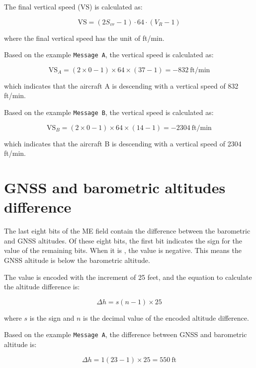 The final vertical speed ($\mathrm{VS}$) is calculated as:

\begin{equation}
  \mathrm{VS} = (2S_{vr} - 1) \cdot 64 \cdot (V_R - 1)
\end{equation}

where the final vertical speed has the unit of ft/min.

Based on the example \texttt{Message A}, the vertical speed is calculated as:

\begin{equation}
  \mathrm{VS}_A = (2 \times 0 - 1) \times 64 \times (37 -1) = -832 ~\text{ft/min}
\end{equation}

which indicates that the aircraft A is descending with a vertical speed of 832 ft/min.

Based on the example \texttt{Message B}, the vertical speed is calculated as:

\begin{equation}
  \mathrm{VS}_B = (2 \times 0 - 1) \times 64 \times (14 -1) = -2304 ~\text{ft/min}
\end{equation}

which indicates that the aircraft B is descending with a vertical speed of 2304 ft/min.


\section{GNSS and barometric altitudes difference}

The last eight bits of the ME field contain the difference between the barometric and GNSS altitudes. Of these eight bits, the first bit indicates the sign for the value of the remaining bits. When it is \1, the value is negative. This means the GNSS altitude is below the barometric altitude.

The value is encoded with the increment of 25 feet, and the equation to calculate the altitude difference is:

\begin{equation}
  \Delta h = s (n - 1) \times 25
\end{equation}

where $s$ is the sign and $n$ is the decimal value of the encoded altitude difference.

Based on the example \texttt{Message A}, the difference between GNSS and barometric altitude is:

\begin{equation}
  \Delta h = 1 (23 - 1) \times 25 = 550 ~\text{ft}
\end{equation}

